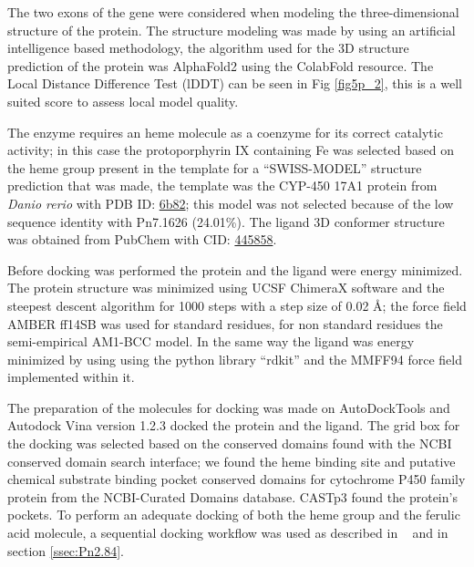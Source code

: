 \documentclass[12pt]{article}
\newcommand{\textcite}[1]{\citeauthor{#1}~\citeyear{#1}}
\begin{document}
	The two exons of the gene were considered when modeling the three-dimensional structure of the protein. The structure modeling was made by using an artificial intelligence based methodology, the algorithm used for the 3D structure prediction of the protein was AlphaFold2 using the ColabFold resource. \cite{alphafold,colabfold} The Local Distance Difference Test (lDDT) can be seen in Fig \ref{fig5p_2}, this is a well suited score to assess local model quality. \cite{lddt}
	
	The enzyme requires an heme molecule as a coenzyme for its correct catalytic activity; in this case the protoporphyrin IX containing Fe was selected based on the heme group present in the template for a ``SWISS-MODEL'' structure prediction that was made, the template was the CYP-450 17A1 protein from \textit{Danio rerio} with PDB ID: \href{https://www.rcsb.org/structure/6b82}{6b82}; this model was not selected because of the low sequence identity with Pn7.1626 (24.01\%). The ligand 3D conformer structure was obtained from PubChem with CID: \href{https://pubchem.ncbi.nlm.nih.gov/compound/445858}{445858}.
	
	Before docking was performed the protein and the ligand were energy minimized. The protein structure was minimized using UCSF ChimeraX software \cite{chimera,chimera_2} and the steepest descent algorithm for 1000 steps with a step size of 0.02 \r{A}; the force field AMBER ff14SB was used for standard residues, for non standard residues the semi-empirical AM1-BCC model. \cite{am1_bcc,am1_bcc_2,am1_bcc_3} In the same way the ligand was energy minimized by using using the python library ``rdkit'' and the MMFF94 force field implemented within it. \cite{rdkit,rdkit_mmff}
	
	The preparation of the molecules for docking was made on AutoDockTools and Autodock Vina version 1.2.3 docked the protein and the ligand. \cite{adt,vina,vina_2} The grid box for the docking was selected based on the conserved domains found with the NCBI conserved domain search interface; we found the heme binding site and putative chemical substrate binding pocket conserved domains for cytochrome P450 family protein from the NCBI-Curated Domains database. \cite{cdd,cdd_2}  CASTp3 found the protein's pockets. \cite{castp} To perform an adequate docking of both the heme group and the ferulic acid molecule, a sequential docking workflow was used as described in \textcite{sequential} and in section \ref{ssec:Pn2.84}.
	
\end{document}
